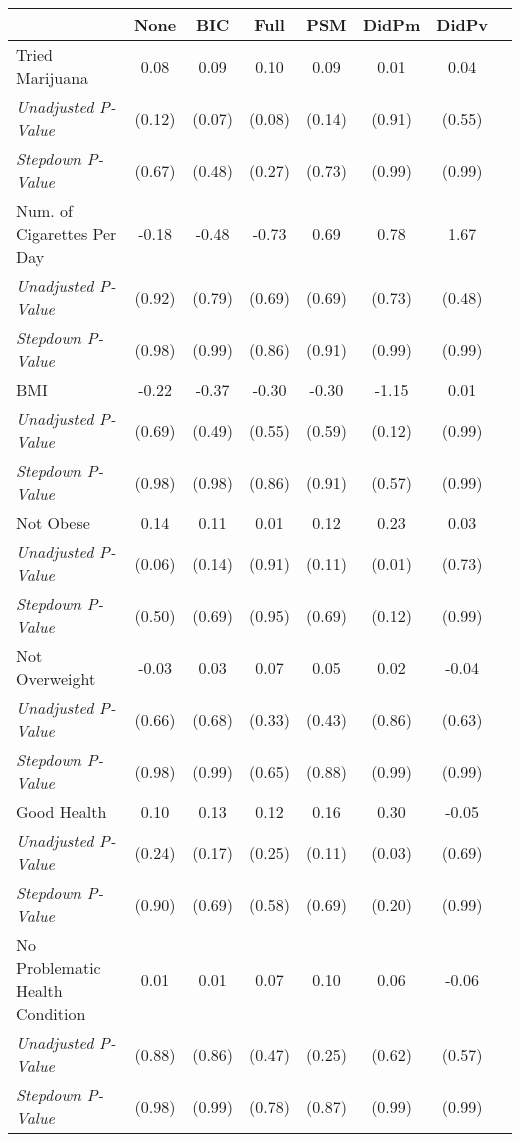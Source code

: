 \begin{tabular}{l c c c c c c c}
\toprule
 & None & BIC & Full & PSM & DidPm & DidPv \\
\midrule
Tried Marijuana & 0.08 & 0.09 & 0.10 & 0.09 & 0.01 & 0.04 \\
\quad \textit{Unadjusted P-Value} & (0.12) & (0.07) & (0.08) & (0.14) & (0.91) & (0.55) \\
\quad \textit{Stepdown P-Value} & (0.67) & (0.48) & (0.27) & (0.73) & (0.99) & (0.99) \\
Num. of Cigarettes Per Day & -0.18 & -0.48 & -0.73 & 0.69 & 0.78 & 1.67 \\
\quad \textit{Unadjusted P-Value} & (0.92) & (0.79) & (0.69) & (0.69) & (0.73) & (0.48) \\
\quad \textit{Stepdown P-Value} & (0.98) & (0.99) & (0.86) & (0.91) & (0.99) & (0.99) \\
BMI & -0.22 & -0.37 & -0.30 & -0.30 & -1.15 & 0.01 \\
\quad \textit{Unadjusted P-Value} & (0.69) & (0.49) & (0.55) & (0.59) & (0.12) & (0.99) \\
\quad \textit{Stepdown P-Value} & (0.98) & (0.98) & (0.86) & (0.91) & (0.57) & (0.99) \\
Not Obese & 0.14 & 0.11 & 0.01 & 0.12 & 0.23 & 0.03 \\
\quad \textit{Unadjusted P-Value} & (0.06) & (0.14) & (0.91) & (0.11) & (0.01) & (0.73) \\
\quad \textit{Stepdown P-Value} & (0.50) & (0.69) & (0.95) & (0.69) & (0.12) & (0.99) \\
Not Overweight & -0.03 & 0.03 & 0.07 & 0.05 & 0.02 & -0.04 \\
\quad \textit{Unadjusted P-Value} & (0.66) & (0.68) & (0.33) & (0.43) & (0.86) & (0.63) \\
\quad \textit{Stepdown P-Value} & (0.98) & (0.99) & (0.65) & (0.88) & (0.99) & (0.99) \\
Good Health & 0.10 & 0.13 & 0.12 & 0.16 & 0.30 & -0.05 \\
\quad \textit{Unadjusted P-Value} & (0.24) & (0.17) & (0.25) & (0.11) & (0.03) & (0.69) \\
\quad \textit{Stepdown P-Value} & (0.90) & (0.69) & (0.58) & (0.69) & (0.20) & (0.99) \\
No Problematic Health Condition & 0.01 & 0.01 & 0.07 & 0.10 & 0.06 & -0.06 \\
\quad \textit{Unadjusted P-Value} & (0.88) & (0.86) & (0.47) & (0.25) & (0.62) & (0.57) \\
\quad \textit{Stepdown P-Value} & (0.98) & (0.99) & (0.78) & (0.87) & (0.99) & (0.99) \\

\end{tabular}
